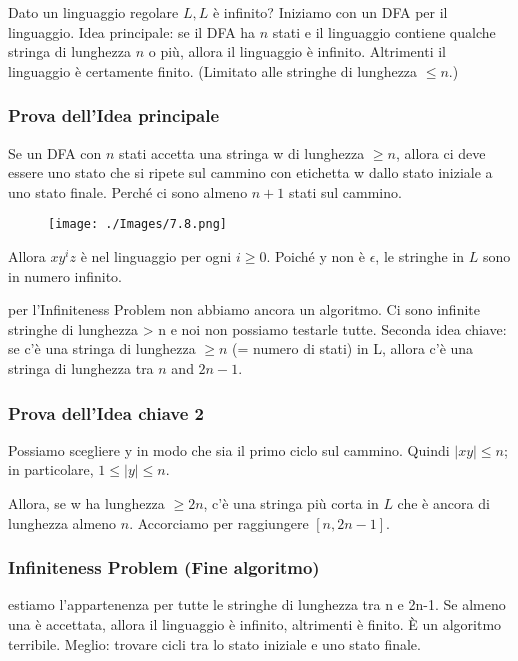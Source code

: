 Dato un linguaggio regolare $L, L$ è infinito? Iniziamo con un DFA per il linguaggio. Idea principale: se il DFA ha $n$ stati e il linguaggio contiene qualche stringa di lunghezza $n$ o più, allora il linguaggio è infinito.
Altrimenti il linguaggio è certamente finito. (Limitato alle stringhe di lunghezza  $\leq n$.)

\subsubsection{Prova dell’Idea principale}

Se un DFA con $n$ stati accetta una stringa w di lunghezza $\geq n$, allora ci deve essere uno stato che si ripete sul cammino con etichetta w dallo stato iniziale a uno stato finale.
Perché ci sono almeno $n+1$ stati sul cammino.

\begin{figure}[hbpt!]
    \centering
    \texttt{[image: ./Images/7.8.png]}
\end{figure}
\FloatBarrier

Allora $x y^{i} z$ è nel linguaggio per ogni $i \geq 0$.
Poiché y non è $\epsilon$, le stringhe in $L$ sono in numero infinito.

\vspace{5mm}

per l'Infiniteness Problem non abbiamo ancora un algoritmo. Ci sono infinite stringhe di lunghezza > n e noi non possiamo testarle tutte. Seconda idea chiave: se c'è una stringa di lunghezza $\geq n$ (= numero di stati) in L, allora c'è una stringa di lunghezza tra $n$ and $2 n-1$.

\subsubsection{Prova dell’Idea chiave 2}

Possiamo scegliere y in modo che sia il
primo ciclo sul cammino.
Quindi $|x y| \leq n$; in particolare,
$1 \leq|y| \leq n$.

Allora, se w ha lunghezza $\geq 2 n$, c'è una
stringa più corta in $L$ che è ancora di
lunghezza almeno $n$.
Accorciamo per raggiungere $[n, 2 n-1] .$

\subsubsection{Infiniteness Problem (Fine algoritmo)}

estiamo l’appartenenza per tutte le stringhe di lunghezza tra n e 2n-1.
Se almeno una è accettata, allora il linguaggio è infinito, altrimenti è finito. È un algoritmo terribile. Meglio: trovare cicli tra lo stato iniziale e uno stato finale.

